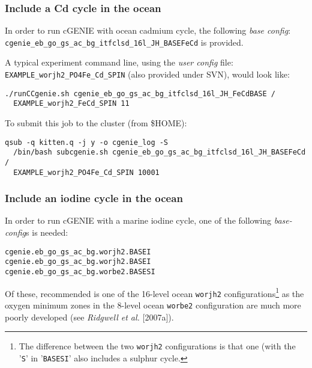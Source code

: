 \documentclass[11pt,fleqn]{book} %
\begin{document}
%
\subsubsection{Include a Cd cycle in the ocean}
\vspace{1mm}

In order to run cGENIE with ocean cadmium cycle, the following \textit{base config}: \\
\texttt{cgenie\_eb\_go\_gs\_ac\_bg\_itfclsd\_16l\_JH\_BASEFeCd} is provided.

A typical experiment command line, using the \textit{user config} file: \texttt{EXAMPLE\_worjh2\_PO4Fe\_Cd\_SPIN} (also provided under SVN), would look like:
\vspace{-4pt}\begin{verbatim}
./runCCgenie.sh cgenie_eb_go_gs_ac_bg_itfclsd_16l_JH_FeCdBASE /
  EXAMPLE_worjh2_FeCd_SPIN 11
\end{verbatim}\vspace{-4pt}

To submit this job to the cluster (from \$HOME):
\vspace{-4pt}\begin{verbatim}
qsub -q kitten.q -j y -o cgenie_log -S
  /bin/bash subcgenie.sh cgenie_eb_go_gs_ac_bg_itfclsd_16l_JH_BASEFeCd /
  EXAMPLE_worjh2_PO4Fe_Cd_SPIN 10001
\end{verbatim}\vspace{-4pt}

%
\subsubsection{Include an iodine cycle in the ocean}
\vspace{1mm}

In order to run cGENIE with a marine iodine cycle, one of the following \textit{base-config}s is needed:
\vspace{-1mm}\begin{verbatim}
cgenie.eb_go_gs_ac_bg.worjh2.BASEI
cgenie.eb_go_gs_ac_bg.worjh2.BASEI
cgenie.eb_go_gs_ac_bg.worbe2.BASESI
\end{verbatim}\vspace{-1mm}
Of these, recommended is one of the 16-level ocean \texttt{worjh2} configurations\footnote{The difference between the two \texttt{worjh2} configurations is that one (with the '\texttt{S}' in '\texttt{BASESI}' also includes a sulphur cycle.} as the oxygen minimum zones in the 8-level ocean \texttt{worbe2} configuration are much more poorly developed (see \textit{Ridgwell et al.} [2007a]).
\end{document}
